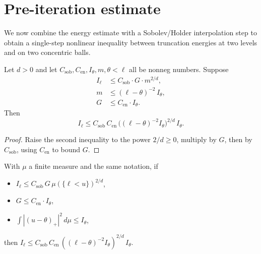 \section{Pre-iteration estimate}

We now combine the energy estimate with a Sobolev/Holder
interpolation step to obtain a single-step nonlinear inequality
between truncation energies at two levels and on two concentric balls.

\begin{theorem}
\label{thm:deGiorgi_preiter_abstract}
\leanok
Let $d > 0$ and let $C_{\mathrm{sob}}, C_{\mathrm{en}}, I_\theta, m,
\theta < \ell$ all be nonneg numbers. Suppose
\begin{align*}
  I_\ell &\le C_{\mathrm{sob}} \cdot G \cdot m^{2/d}, \\
  m &\le (\ell - \theta)^{-2}\, I_\theta, \\
  G &\le C_{\mathrm{en}} \cdot I_\theta.
\end{align*}
Then
\begin{equation*}
  I_\ell \le C_{\mathrm{sob}}\, C_{\mathrm{en}}\,
    \bigl((\ell-\theta)^{-2} I_\theta\bigr)^{2/d}\, I_\theta.
\end{equation*}
\end{theorem}

\begin{proof}
\leanok

Raise the second inequality to the power $2/d \ge 0$, multiply by
$G$, then by $C_{\mathrm{sob}}$, using $C_{\mathrm{en}}$ to bound
$G$.
\end{proof}

\begin{theorem}
\label{thm:deGiorgi_preiter_of_energy}
\leanok
{}
With $\mu$ a finite measure and the same notation, if
\begin{itemize}
\item $I_\ell \le C_{\mathrm{sob}}\, G\, \mu(\{\ell < u\})^{2/d}$,
\item $G \le C_{\mathrm{en}} \cdot I_\theta$,
\item $\int |(u-\theta)_+|^2 \, d\mu \le I_\theta$,
\end{itemize}
then
\(
  I_\ell \le C_{\mathrm{sob}}\, C_{\mathrm{en}}\,
    ((\ell-\theta)^{-2} I_\theta)^{2/d}\, I_\theta.
\)
\end{theorem}

